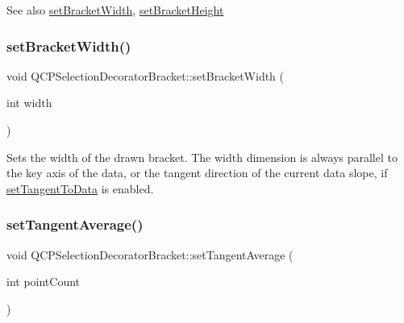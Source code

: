 \begin{DoxySeeAlso}{See also}
\hyperlink{class_q_c_p_selection_decorator_bracket_a291b59cab98ce93a0a3c85963fe10f5e}{set\+Bracket\+Width}, \hyperlink{class_q_c_p_selection_decorator_bracket_aed773ad737201cca40efc6fe451acad8}{set\+Bracket\+Height} 
\end{DoxySeeAlso}
\mbox{\label{class_q_c_p_selection_decorator_bracket_a291b59cab98ce93a0a3c85963fe10f5e}} 
\subsubsection{\texorpdfstring{set\+Bracket\+Width()}{setBracketWidth()}}
{\footnotesize\ttfamily void Q\+C\+P\+Selection\+Decorator\+Bracket\+::set\+Bracket\+Width (\begin{DoxyParamCaption}\item[{int}]{width }\end{DoxyParamCaption})}

Sets the width of the drawn bracket. The width dimension is always parallel to the key axis of the data, or the tangent direction of the current data slope, if \hyperlink{class_q_c_p_selection_decorator_bracket_a93bc6086e53a5e40a08641a7b2e2cdd5}{set\+Tangent\+To\+Data} is enabled. \mbox{\label{class_q_c_p_selection_decorator_bracket_adb2d0876f25a77c88042b70818f1d6e4}} 
\subsubsection{\texorpdfstring{set\+Tangent\+Average()}{setTangentAverage()}}
{\footnotesize\ttfamily void Q\+C\+P\+Selection\+Decorator\+Bracket\+::set\+Tangent\+Average (\begin{DoxyParamCaption}\item[{int}]{point\+Count }\end{DoxyParamCaption})}

